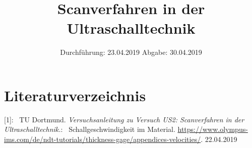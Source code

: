 

\subject{Nr. US2}
\title{Scanverfahren in der Ultraschalltechnik}
\date{%
  Durchführung: 23.04.2019
  \hspace{3em}
  Abgabe: 30.04.2019
}



\maketitle
\thispagestyle{empty}
\tableofcontents
\newpage






\section{Literaturverzeichnis}

[1]: \ TU Dortmund. \textit{Versuchsanleitung zu Versuch US2:
Scanverfahren in der Ultraschalltechnik.}\newline
[1]: \ Schallgeschwindigkeit im Material. 
\url{https://www.olympus-ims.com/de/ndt-tutorials/thickness-gage/appendices-velocities/}. 22.04.2019

\printbibliography{}


